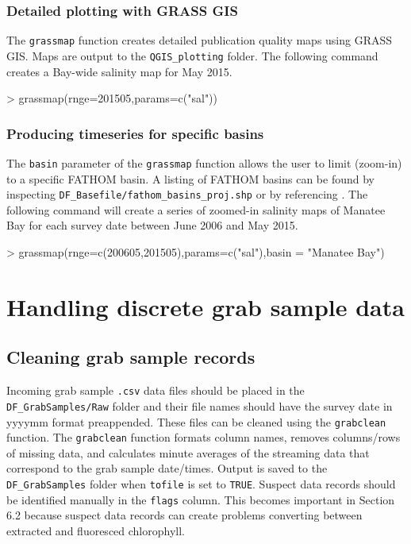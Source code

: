 \documentclass[12pt]{article}
\begin{document}
\subsubsection{Detailed plotting with GRASS GIS}

The \texttt{grassmap} function creates detailed publication quality maps using GRASS GIS. Maps are output to the \verb|QGIS_plotting| folder. The following command creates a Bay-wide salinity map for May 2015.

\begin{Schunk}
\begin{Sinput}
> grassmap(rnge=201505,params=c("sal"))
\end{Sinput}
\end{Schunk}

\subsubsection{Producing timeseries for specific basins}

The \texttt{basin} parameter of the \texttt{grassmap} function allows the user to limit (zoom-in) to a specific FATHOM basin. A listing of FATHOM basins can be found by inspecting \verb|DF_Basefile/fathom_basins_proj.shp| or by referencing \citet{cosby2005fathom}. The following command will create a series of zoomed-in salinity maps of Manatee Bay for each survey date between June 2006 and May 2015.   

\begin{Schunk}
\begin{Sinput}
> grassmap(rnge=c(200605,201505),params=c("sal"),basin = "Manatee Bay")
\end{Sinput}
\end{Schunk}


\section{Handling discrete grab sample data}
\subsection{Cleaning grab sample records}
Incoming grab sample \texttt{.csv} data files should be placed in the \verb|DF_GrabSamples/Raw| folder and their file names should have the survey date in yyyymm format preappended. These files can be cleaned using the \texttt{grabclean} function. The \texttt{grabclean} function formats column names, removes columns/rows of missing data, and calculates minute averages of the streaming data that correspond to the grab sample date/times. Output is saved to the \verb|DF_GrabSamples| folder when \texttt{tofile} is set to \texttt{TRUE}. Suspect data records should be identified manually in the \texttt{flags} column. This becomes important in Section 6.2 because suspect data records can create problems converting between extracted and fluoresced chlorophyll.
\end{document}
